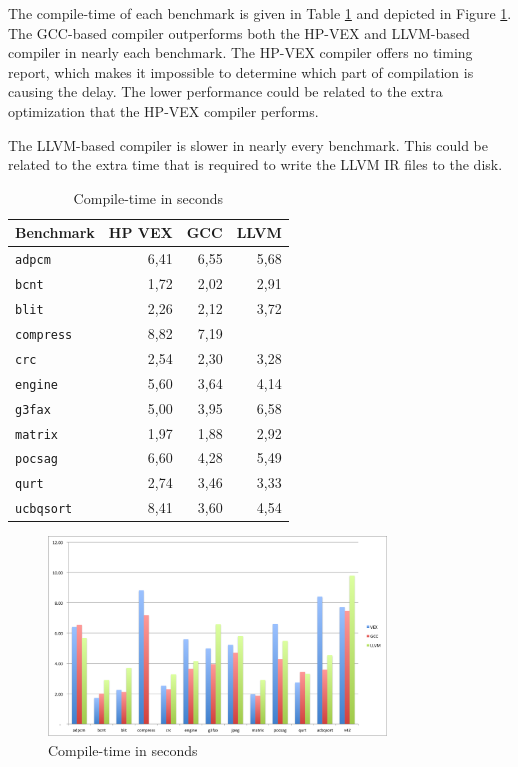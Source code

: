 The compile-time of each benchmark is given in Table \ref{tbl:compile-time} and depicted in Figure \ref{fig:compile-time}. The GCC-based compiler outperforms both the HP-VEX and LLVM-based compiler in nearly each benchmark. The HP-VEX compiler offers no timing report, which makes it impossible to determine which part of compilation is causing the delay. The lower performance could be related to the extra optimization that the HP-VEX compiler performs. 

The LLVM-based compiler is slower in nearly every benchmark. This could be related to the extra time that is required to write the LLVM IR files to the disk. %




\begin{table}
  \centering
    \begin{tabular}{|l|r|r|r|}
    \hline
    \textbf{Benchmark} & \multicolumn{1}{|r|}{\textbf{HP VEX}} & \multicolumn{1}{|r|}{\textbf{GCC}}  & \multicolumn{1}{|r|}{\textbf{LLVM}} \\ \hline
	\texttt{adpcm} 		& 6,41 & 6,55 & 5,68 \\ \hline
	\texttt{bcnt} 		& 1,72 & 2,02 & 2,91 \\ \hline
	\texttt{blit} 		& 2,26 & 2,12 & 3,72 \\ \hline
	\texttt{compress} 	& 8,82 & 7,19 & \\ \hline
	\texttt{crc} 		& 2,54 & 2,30 & 3,28 \\ \hline
	\texttt{engine} 	& 5,60 & 3,64 & 4,14 \\ \hline
	\texttt{g3fax} 		& 5,00 & 3,95 & 6,58 \\ \hline
	\texttt{matrix} 	& 1,97 & 1,88 & 2,92 \\ \hline
	\texttt{pocsag} 	& 6,60 & 4,28 & 5,49 \\ \hline
	\texttt{qurt}	 	& 2,74 & 3,46 & 3,33 \\ \hline
	\texttt{ucbqsort} 	& 8,41 & 3,60 & 4,54 \\ \hline
    \end{tabular}
  \caption{Compile-time in seconds}
  \label{tbl:compile-time}
\end{table}

\begin{figure}[ht]
\centering
\includegraphics[width=0.8\textwidth]{5_results/img/compile-time.png}
\caption{Compile-time in seconds}
\label{fig:compile-time}
\end{figure}

